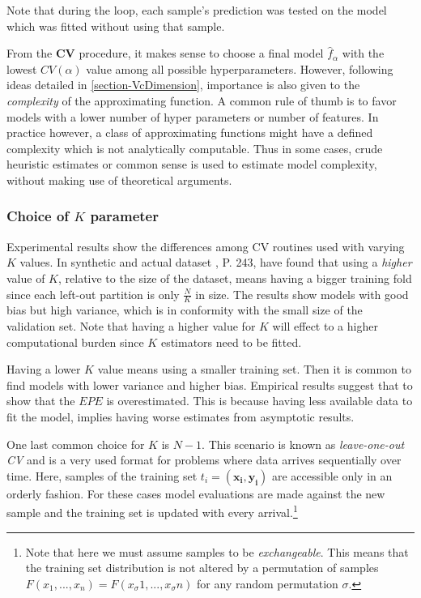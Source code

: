 Note that during the loop, each sample's prediction was tested on the model which was fitted without using that sample.

From the \textbf{CV} procedure, it makes sense to choose a final model $\hat{f}_\alpha$ with the lowest $CV(\alpha)$ value among all possible hyperparameters. However, following ideas detailed in \cref{section-VcDimension}, importance is also given to the \textit{complexity} of the approximating function. A common rule of thumb is to favor models with a lower number of hyper parameters or number of features. In practice however, a class of approximating functions might have a defined complexity which is not analytically computable. Thus in some cases, crude heuristic estimates or common sense is used to estimate model complexity, without making use of theoretical arguments.

\subsubsection{Choice of $K$ parameter}

Experimental results show the differences among CV routines used with varying $K$ values. In synthetic and actual dataset , \textcite{hastie-elemstatslearn} P. 243, have found that using a \textit{higher} value of $K$, relative to the size of the dataset, means having a bigger training fold since each left-out partition is only $\frac{N}{K}$ in size. The results show models with good bias but high variance, which is in conformity with the small size of the validation set. Note that having a higher value for $K$ will effect to a higher computational burden since $K$ estimators need to be fitted.

Having a lower $K$ value means using a smaller training set. Then it is common to find models with lower variance and higher bias. Empirical results suggest that to show that the $EPE$ is overestimated. This is because having less available data to fit the model, implies having worse estimates from asymptotic results.

One last common choice for $K$ is $N-1$. This scenario is known as \textit{leave-one-out CV} and is a very used format for problems where data arrives sequentially over time. Here, samples of the training set $t_i = ( \boldsymbol{x_i} , \boldsymbol{y_i} )$ are accessible only in an orderly fashion. For these cases model evaluations are made against the new sample and the training set is updated with every arrival.\footnote{Note that here we must assume samples to be \textit{exchangeable}. This means that the training set distribution is not altered by a permutation of samples $F(x_1,...,x_n ) = F(x_\sigma{1},...,x_\sigma{n})$ for any random permutation $\sigma$.}



